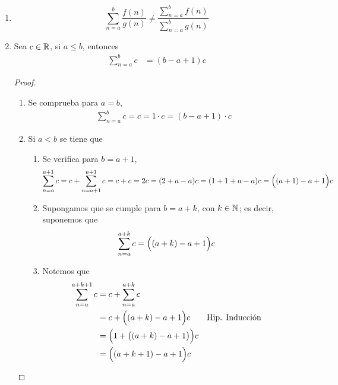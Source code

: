 \begin{enumerate}[label=\alph*)]
  \begin{proof}\leavevmode
    Sea $a$ y $b=a+1$, tenemos que
    \begin{align*}
      \sum_{n=a}^{b} \big(f(n)\cdot g(n)\big) &= f(a)\cdot g(a) + \sum_{a+1}^{a+1} \big(f(n)\cdot g(n)\big)\\
      &= f(a)\cdot g(a) + f(a+1)\cdot g(a+1)\\
      &\neq \big(f(a)+f(a+1)\big) \cdot \big(g(a)+g(a+1)\big)\\
      &= \left(\sum_{n=a}^{b} f(n)\right)  \cdot \left(\sum_{n=a}^{b} g(n)\right)
    \end{align*}
  \end{proof}
  
  \item \[\sum_{n=a}^{b} \frac{f(n)}{g(n)} \neq \frac{\sum_{n=a}^{b} f(n)}{\sum_{n=a}^{b}g(n)}\]  


  \item Sea $c\in \mathbb{R}$, si $a\leq b$, entonces \begin{align*}
    \sum_{n=a}^b c &= (b-a+1)c
  \end{align*}
  \begin{proof}\leavevmode
    \begin{enumerate}[label=\Roman*)]
      \item Se comprueba para $a=b$, \begin{align*}
        \sum_{n=a}^b c = c = 1\cdot c = (b-a+1)\cdot c
      \end{align*}
      \item Si $a<b$ se tiene que \begin{enumerate}[label=\roman*)]
        \item Se verifica para $b=a+1$, \begin{align*}
          \sum_{n=a}^{a+1} c &= c + \sum_{n=a+1}^{a+1} c = c + c = 2c = (2+a-a)c = (1+1+a-a)c = \Bigl((a+1)-a+1\Bigr) c
        \end{align*}
        \item Supongamos que se cumple para $b=a+k$, con $k\in \mathbb{N}$; es decir, suponemos que \begin{align*}
          \sum_{n=a}^{a+k} c &= \Bigl((a+k)-a+1\Bigr) c
        \end{align*}
        \item Notemos que \begin{align*}
          \sum_{n=a}^{a+k+1} c &= c + \sum_{n=a}^{a+k} c\\
          &= c + \Bigl((a+k)-a+1\Bigr) c && \text{Hip. Inducción}\\
          &= \Bigl(1 + \bigl((a+k)-a+1\bigr) \Bigr)c\\
          &= \Bigl((a+k+1)-a+1\Bigr)c
        \end{align*}
      \end{enumerate}
    \end{enumerate}
  \end{proof}


\end{enumerate}

